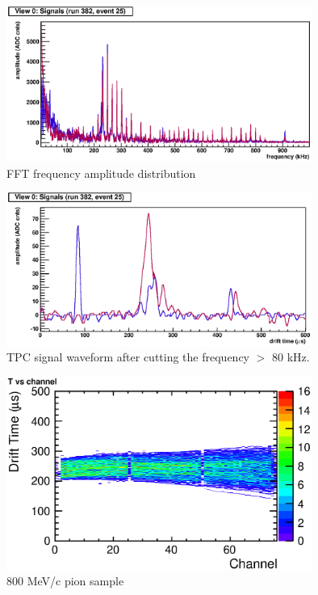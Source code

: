 \begin{figure}[htbp]
 \begin{center}
  \includegraphics[width=100mm]{fig/FFT.eps}
 \end{center}
 \caption{FFT frequency amplitude distribution}
 \label{Fig:beforeFFT}
\end{figure}

\begin{figure}[htbp]
 \begin{center}
  \includegraphics[width=100mm]{fig/afterFFT.eps}
 \end{center}
 \caption{TPC signal waveform after cutting the frequency $>$ 80 kHz.}
 \label{Fig:afterFFT}
\end{figure}




\begin{figure}[htbp]
 \begin{center}
  \includegraphics[width=100mm]{fig/PionTrack.eps}
 \end{center}
 \caption{800 MeV/c pion sample}
 \label{fig:PionTrack}
\end{figure}

